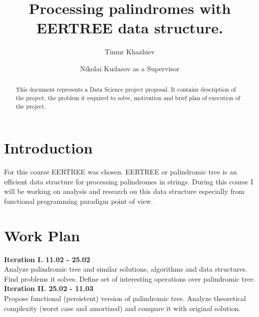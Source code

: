 \documentclass[sigconf]{acmart}
\begin{document}
%
\title{Processing palindromes with EERTREE data structure.}

%
\author{Timur Khazhiev}

\author{Nikolai Kudasov as a Supervisor}


%
\begin{abstract}
This document represents a Data Science project proposal. It contains description of the project, the problem it required to solve, motivation and brief plan of execution of the project.
\end{abstract}


%
\maketitle

\section{Introduction}
For this course EERTREE was chosen. EERTREE or palindromic tree is an efficient data structure for processing palindromes in strings. During this course I will be working on analysis and research on this data structure especially from functional programming paradigm point of view.

\section{Work Plan}
\textbf{Iteration I. 11.02 - 25.02}\\
Analyze palindromic tree and similar solutions, algorithms and data structures. Find problems it solves. Define set of interesting operations over palindromic tree.\\

\textbf{Iteration II. 25.02 - 11.03}\\
Propose functional (persistent) version of palindromic tree. Analyze theoretical complexity (worst case and amortized) and compare it with original solution.\\
\end{document}
